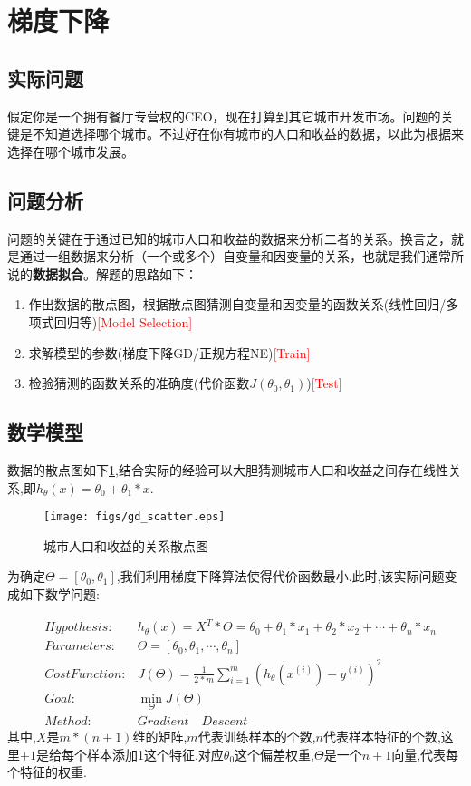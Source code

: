 \section{梯度下降}
\subsection{实际问题}
假定你是一个拥有餐厅专营权的CEO，现在打算到其它城市开发市场。问题的关键是不知道选择哪个城市。不过好在你有城市的人口和收益的数据，以此为根据来选择在哪个城市发展。

\subsection{问题分析}
问题的关键在于通过已知的城市人口和收益的数据来分析二者的关系。换言之，就是通过一组数据来分析（一个或多个）自变量和因变量的关系，也就是我们通常所说的\textbf{数据拟合}。解题的思路如下：
\begin{enumerate}
\item 作出数据的散点图，根据散点图猜测自变量和因变量的函数关系(线性回归/多项式回归等)\textcolor{red}{[Model Selection]}
\item 求解模型的参数(梯度下降GD/正规方程NE)\textcolor{red}{[Train]}
\item 检验猜测的函数关系的准确度(代价函数$J(\theta_0,\theta_1)$)\textcolor{red}{[Test]}
\end{enumerate}

\subsection{数学模型}
数据的散点图如下\ref{gd:figure:scatter},结合实际的经验可以大胆猜测城市人口和收益之间存在线性关系,即$h_{\theta}(x)=\theta_0+\theta_1*x$.
\begin{figure}[!htbp]
	\centering
	\texttt{[image: figs/gd\_scatter.eps]} 
	\caption{城市人口和收益的关系散点图}    	\label{gd:figure:scatter}
\end{figure}
为确定$\Theta=[\theta_0,\theta_1]$,我们利用梯度下降算法使得代价函数最小.此时,该实际问题变成如下数学问题:

\begin{eqnarray}
&Hypothesis: & h_{\theta}(x)=X^T*\Theta=
\theta_0+\theta_1*x_1+\theta_2*x_2+\cdots+\theta_n*x_n \nonumber \\ 
&Parameters: & \Theta = [\theta_0,\theta_1,\cdots,\theta_n] \nonumber \\
&Cost Function:& J(\Theta)=
\frac{1}{2*m}\sum_{i=1}^m(h_{\theta}(x^{(i)})-y^{(i)})^2 \nonumber \\
&Goal:& \min_{\Theta} J(\Theta) \nonumber \\
&Method:&  Gradient \quad Descent  \nonumber 
\end{eqnarray}
其中,$X$是$m*(n+1)$维的矩阵,$m$代表训练样本的个数,$n$代表样本特征的个数,这里$+1$是给每个样本添加1这个特征,对应$\theta_0$这个偏差权重,$\Theta$是一个$n+1$向量,代表每个特征的权重.


